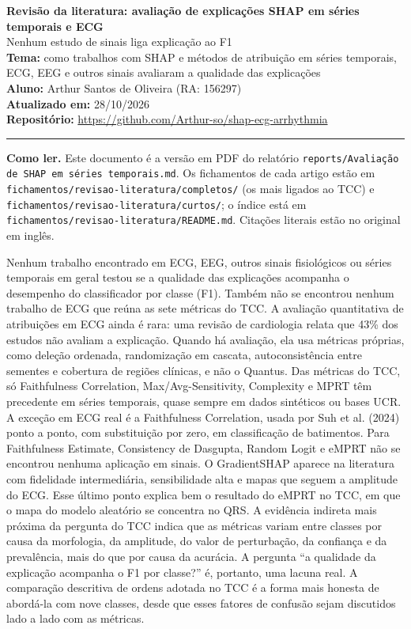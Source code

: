 \documentclass[11pt,a4paper]{article}
\begin{document}
\begin{center}
    {\LARGE \textbf{Revisão da literatura: avaliação de explicações SHAP em séries temporais e ECG}} \\[0.35em]
    {\large Nenhum estudo de sinais liga explicação ao F1} \\[0.3em]
    \textbf{Tema:} como trabalhos com SHAP e métodos de atribuição em séries temporais, ECG, EEG e outros sinais avaliaram a qualidade das explicações \\[0.2em]
    \textbf{Aluno:} Arthur Santos de Oliveira (RA: 156297) \\[0.2em]
    \textbf{Atualizado em:} 28/10/2026 \\[0.2em]
    \textbf{Repositório:} \url{https://github.com/Arthur-so/shap-ecg-arrhythmia}
\end{center}
\vspace{-0.5em}
\hrule
\vspace{0.8em}

{\raggedright\textbf{Como ler.} Este documento é a versão em PDF do relatório \texttt{reports/Avaliação de SHAP em séries temporais.md}. Os fichamentos de cada artigo estão em \texttt{fichamentos/revisao-literatura/completos/} (os mais ligados ao TCC) e \texttt{fichamentos/revisao-literatura/curtos/}; o índice está em \texttt{fichamentos/revisao-literatura/README.md}. Citações literais estão no original em inglês.\par}


Nenhum trabalho encontrado em ECG, EEG, outros sinais fisiológicos ou séries temporais em geral testou se a qualidade das explicações acompanha o desempenho do classificador por classe (F1). Também não se encontrou nenhum trabalho de ECG que reúna as sete métricas do TCC. A avaliação quantitativa de atribuições em ECG ainda é rara: uma revisão de cardiologia relata que 43\% dos estudos não avaliam a explicação. Quando há avaliação, ela usa métricas próprias, como deleção ordenada, randomização em cascata, autoconsistência entre sementes e cobertura de regiões clínicas, e não o Quantus. Das métricas do TCC, só Faithfulness Correlation, Max/Avg-Sensitivity, Complexity e MPRT têm precedente em séries temporais, quase sempre em dados sintéticos ou bases UCR. A exceção em ECG real é a Faithfulness Correlation, usada por Suh et al. (2024) ponto a ponto, com substituição por zero, em classificação de batimentos. Para Faithfulness Estimate, Consistency de Dasgupta, Random Logit e eMPRT não se encontrou nenhuma aplicação em sinais. O GradientSHAP aparece na literatura com fidelidade intermediária, sensibilidade alta e mapas que seguem a amplitude do ECG. Esse último ponto explica bem o resultado do eMPRT no TCC, em que o mapa do modelo aleatório se concentra no QRS. A evidência indireta mais próxima da pergunta do TCC indica que as métricas variam entre classes por causa da morfologia, da amplitude, do valor de perturbação, da confiança e da prevalência, mais do que por causa da acurácia. A pergunta ``a qualidade da explicação acompanha o F1 por classe?'' é, portanto, uma lacuna real. A comparação descritiva de ordens adotada no TCC é a forma mais honesta de abordá-la com nove classes, desde que esses fatores de confusão sejam discutidos lado a lado com as métricas.
\end{document}
